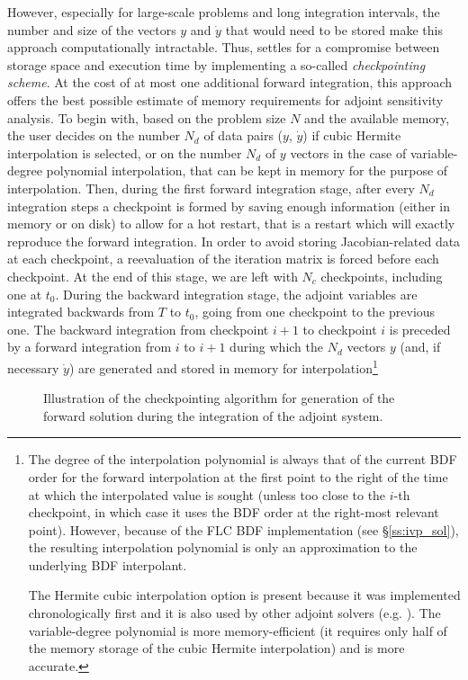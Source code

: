 However, especially for large-scale problems and long integration
intervals, the number and size of the vectors $y$ and ${\dot y}$ that would 
need to be stored make this approach computationally intractable. 
Thus, {\idas} settles for a compromise between storage space and execution time by
implementing a so-called {\em checkpointing scheme}. At the cost of at most one
additional forward integration, this approach offers the best possible estimate
of memory requirements for adjoint sensitivity analysis. To begin with, based on
the problem size $N$ and the available memory, the user decides on the number
$N_d$ of data pairs ($y$, ${\dot y}$) if cubic Hermite interpolation is selected, 
or on the number $N_d$ of $y$ vectors in the case of variable-degree polynomial
interpolation, that can be kept in memory for the purpose of interpolation. 
Then, during the first forward integration stage, after
every $N_d$ integration steps a checkpoint is formed by saving enough information
(either in memory or on disk) to allow for a hot restart, that is a restart
which will exactly reproduce the forward integration. In order to avoid storing
Jacobian-related data at each checkpoint, a reevaluation of the iteration matrix
is forced before each checkpoint. At the end of this stage, we are left with $N_c$ 
checkpoints, including one at $t_0$.
During the backward integration stage, the adjoint variables are integrated
backwards from $T$ to $t_0$, going from one checkpoint to the previous one.
The backward integration from checkpoint $i+1$ to checkpoint $i$ is preceded
by a forward integration from $i$ to $i+1$ during which the $N_d$ vectors 
$y$ (and, if necessary ${\dot y}$) are generated and stored in memory for 
interpolation\footnote{The degree of the 
interpolation polynomial is always that of the current BDF order for the forward
interpolation at the first point to the right of the time at which the interpolated
value is sought (unless too close to the $i$-th checkpoint, in which case it uses
the BDF order at the right-most relevant point). However, because of the FLC BDF
implementation (see \S\ref{ss:ivp_sol}), the resulting interpolation polynomial
is only an approximation to the underlying BDF interpolant.

The Hermite cubic interpolation option is present because it was implemented
chronologically first and it is also used by other adjoint solvers (e.g. {\daspkadjoint}).
The variable-degree polynomial is more memory-efficient (it requires only half of the
memory storage of the cubic Hermite interpolation) and is more accurate.}
%
\begin{figure}
\centerline{}
\caption {Illustration of the checkpointing algorithm for generation of 
  the forward solution during the integration of the adjoint system.}
\label{f:ckpnt}
\end{figure}

